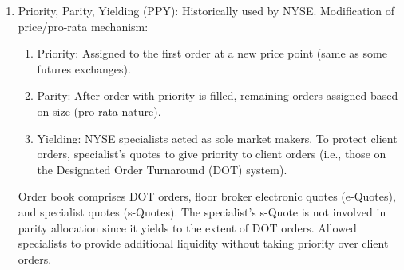 \begin{definition}
\begin{enumerate}[label=\roman*.]
\begin{enumerate}[label=\arabic*.]
\setlength{\itemsep}{0pt}
\item Pro-rata but rounds down all allocations, assigns zero to orders that end up with less than two units.
\item Remaining quantity distributed on time-based priority, earlier orders receive additional allocation.
\end{enumerate}
First order at the price has special priority and secondary time priority. This hybrid approach combines both size and time incentives.
\item Priority, Parity, Yielding (PPY): Historically used by NYSE. Modification of price/pro-rata mechanism:
\begin{enumerate}[label=\arabic*.]
\setlength{\itemsep}{0pt}
\item Priority: Assigned to the first order at a new price point (same as some futures exchanges).
\item Parity: After order with priority is filled, remaining orders assigned based on size (pro-rata nature).
\item Yielding: NYSE specialists acted as sole market makers. To protect client orders, specialist's quotes to give priority to client orders (i.e., those on the Designated Order Turnaround (DOT) system).
\end{enumerate}
Order book comprises DOT orders, floor broker electronic quotes (e-Quotes), and specialist quotes (s-Quotes). The specialist's s-Quote is not involved in parity allocation since it yields to the extent of DOT orders. Allowed specialists to provide additional liquidity without taking priority over client orders.
\end{enumerate}
\end{definition}


